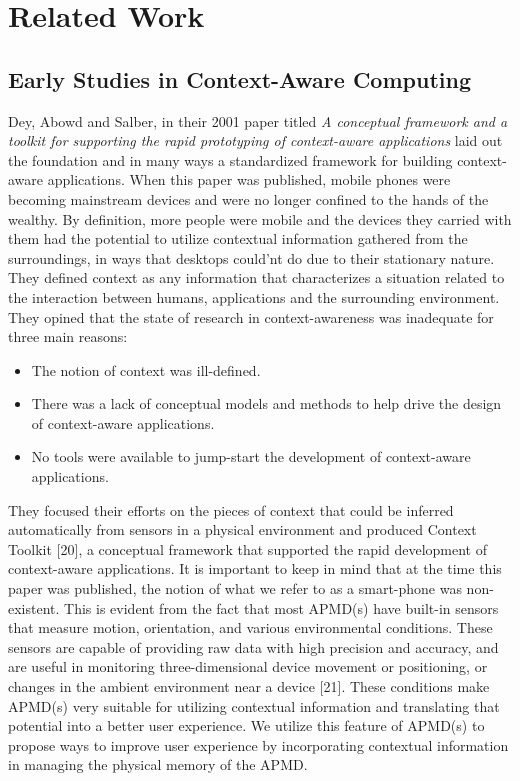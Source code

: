 \documentclass[12pt]{uthesis-v12}  %
\begin{document}

\chapter{Related Work}
	
	\section{Early Studies in Context-Aware Computing}
		Dey, Abowd and Salber, in their 2001 paper titled {\em A conceptual framework and a toolkit for supporting the rapid prototyping of context-aware applications} laid out the foundation and in many ways a standardized framework for building context-aware applications. When this paper was published, mobile phones were becoming mainstream devices and were no longer confined to the hands of the wealthy. By definition, more people were mobile and the devices they carried with them had the potential to utilize contextual information gathered from the surroundings, in ways that desktops could'nt do due to their stationary nature. They defined context as any information that characterizes a situation related to the interaction between humans, applications and the surrounding environment. They opined that the state of research in context-awareness was inadequate for three main reasons:
		
		\begin{itemize}
			\item The notion of context was ill-defined.
			\item There was a lack of conceptual models and methods to help drive the design of context-aware applications.
			\item No tools were available to jump-start the development of context-aware applications.
		\end{itemize}
		
		 They focused their efforts on the pieces of context that could be inferred automatically from sensors in a physical environment and produced Context Toolkit [20], a conceptual framework that supported the rapid development of context-aware applications. It is important to keep in mind that at the time this paper was published, the notion of what we refer to as a smart-phone was non-existent. This is evident from the fact that most APMD(s) have built-in sensors that measure motion, orientation, and various environmental conditions. These sensors are capable of providing raw data with high precision and accuracy, and are useful in monitoring three-dimensional device movement or positioning, or changes in the ambient environment near a device [21]. These conditions make APMD(s) very suitable for utilizing contextual information and translating that potential into a better user experience. We utilize this feature of APMD(s) to propose ways to improve user experience by incorporating contextual information in managing the physical memory of the APMD.		
			
\end{document}
